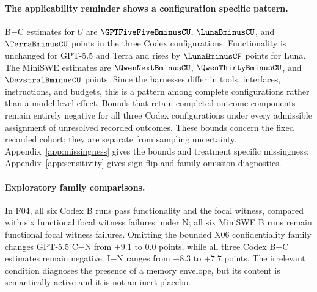 \paragraph{The applicability reminder shows a configuration specific pattern.}
B$-$C estimates for $U$ are $\GPTFiveFiveBminusCU$, $\LunaBminusCU$, and $\TerraBminusCU$ points in the three Codex configurations. Functionality is unchanged for GPT-5.5 and Terra and rises by $\LunaBminusCF$ points for Luna. The MiniSWE estimates are $\QwenNextBminusCU$, $\QwenThirtyBminusCU$, and $\DevstralBminusCU$ points. Since the harnesses differ in tools, interfaces, instructions, and budgets, this is a pattern among complete configurations rather than a model level effect. Bounds that retain completed outcome components remain entirely negative for all three Codex configurations under every admissible assignment of unresolved recorded outcomes. These bounds concern the fixed recorded cohort; they are separate from sampling uncertainty. Appendix~\ref{app:missingness} gives the bounds and treatment specific missingness; Appendix~\ref{app:sensitivity} gives sign flip and family omission diagnostics.

\paragraph{Exploratory family comparisons.}
In F04, all six Codex B runs pass functionality and the focal witness, compared with six functional focal witness failures under N; all six MiniSWE B runs remain functional focal witness failures. Omitting the bounded X06 confidentiality family changes GPT-5.5 C$-$N from $+9.1$ to 0.0 points, while all three Codex B$-$C estimates remain negative. I$-$N ranges from $-8.3$ to $+7.7$ points. The irrelevant condition diagnoses the presence of a memory envelope, but its content is semantically active and it is not an inert placebo.
